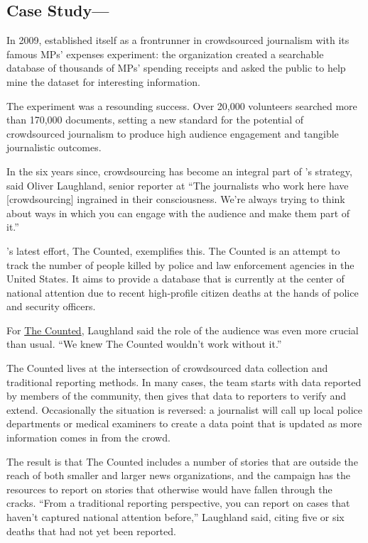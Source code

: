 \begin{itemize}
\begin{itemize}
\begin{enumerate}
{\subsection{Case Study---}

In 2009,  established itself as a frontrunner in crowdsourced journalism with its famous MPs’ expenses experiment: the organization created a searchable database of thousands of MPs’ spending receipts and asked the public to help mine the dataset for interesting information.

The experiment was a resounding success. Over 20,000 volunteers searched more than 170,000 documents, setting a new standard for the potential of crowdsourced journalism to produce high audience engagement and tangible journalistic outcomes. 

In the six years since, crowdsourcing has become an integral part of ’s strategy, said Oliver Laughland, senior reporter at \autocite{Laughland} ``The journalists who work here have [crowdsourcing] ingrained in their consciousness. We’re always trying to think about ways in which you can engage with the audience and make them part of it.''

’s latest effort, The Counted, exemplifies this.\autocite{Counted} The Counted is an attempt to track the number of people killed by police and law enforcement agencies in the United States. It aims to provide a database that is currently at the center of national attention due to recent high-profile citizen deaths at the hands of police and security officers.

For \href{http://www.theguardian.com/us-news/series/counted-us-police-killings}{The Counted}, Laughland said the role of the audience was even more crucial than usual. ``We knew The Counted wouldn’t work without it.''\autocite{Laughland}

The Counted lives at the intersection of crowdsourced data collection and traditional reporting methods. In many cases, the team starts with data reported by members of the community, then gives that data to reporters to verify and extend. Occasionally the situation is reversed: a journalist will call up local police departments or medical examiners to create a data point that is updated as more information comes in from the crowd. 

The result is that The Counted includes a number of stories that are outside the reach of both smaller and larger news organizations, and the campaign has the resources to report on stories that otherwise would have fallen through the cracks. ``From a traditional reporting perspective, you can report on cases that haven’t captured national attention before,'' Laughland said, citing five or six deaths that had not yet been reported. 

}
\end{enumerate}
\end{itemize}
\end{itemize}
